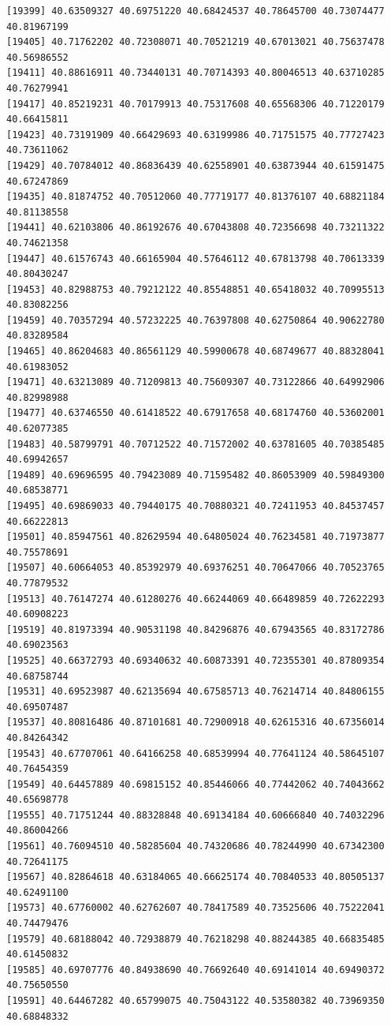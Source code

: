 \documentclass[
  letterpaper,
  DIV=11,
  numbers=noendperiod]{scrartcl}
\begin{document}
\begin{verbatim}
[19399] 40.63509327 40.69751220 40.68424537 40.78645700 40.73074477 40.81967199
[19405] 40.71762202 40.72308071 40.70521219 40.67013021 40.75637478 40.56986552
[19411] 40.88616911 40.73440131 40.70714393 40.80046513 40.63710285 40.76279941
[19417] 40.85219231 40.70179913 40.75317608 40.65568306 40.71220179 40.66415811
[19423] 40.73191909 40.66429693 40.63199986 40.71751575 40.77727423 40.73611062
[19429] 40.70784012 40.86836439 40.62558901 40.63873944 40.61591475 40.67247869
[19435] 40.81874752 40.70512060 40.77719177 40.81376107 40.68821184 40.81138558
[19441] 40.62103806 40.86192676 40.67043808 40.72356698 40.73211322 40.74621358
[19447] 40.61576743 40.66165904 40.57646112 40.67813798 40.70613339 40.80430247
[19453] 40.82988753 40.79212122 40.85548851 40.65418032 40.70995513 40.83082256
[19459] 40.70357294 40.57232225 40.76397808 40.62750864 40.90622780 40.83289584
[19465] 40.86204683 40.86561129 40.59900678 40.68749677 40.88328041 40.61983052
[19471] 40.63213089 40.71209813 40.75609307 40.73122866 40.64992906 40.82998988
[19477] 40.63746550 40.61418522 40.67917658 40.68174760 40.53602001 40.62077385
[19483] 40.58799791 40.70712522 40.71572002 40.63781605 40.70385485 40.69942657
[19489] 40.69696595 40.79423089 40.71595482 40.86053909 40.59849300 40.68538771
[19495] 40.69869033 40.79440175 40.70880321 40.72411953 40.84537457 40.66222813
[19501] 40.85947561 40.82629594 40.64805024 40.76234581 40.71973877 40.75578691
[19507] 40.60664053 40.85392979 40.69376251 40.70647066 40.70523765 40.77879532
[19513] 40.76147274 40.61280276 40.66244069 40.66489859 40.72622293 40.60908223
[19519] 40.81973394 40.90531198 40.84296876 40.67943565 40.83172786 40.69023563
[19525] 40.66372793 40.69340632 40.60873391 40.72355301 40.87809354 40.68758744
[19531] 40.69523987 40.62135694 40.67585713 40.76214714 40.84806155 40.69507487
[19537] 40.80816486 40.87101681 40.72900918 40.62615316 40.67356014 40.84264342
[19543] 40.67707061 40.64166258 40.68539994 40.77641124 40.58645107 40.76454359
[19549] 40.64457889 40.69815152 40.85446066 40.77442062 40.74043662 40.65698778
[19555] 40.71751244 40.88328848 40.69134184 40.60666840 40.74032296 40.86004266
[19561] 40.76094510 40.58285604 40.74320686 40.78244990 40.67342300 40.72641175
[19567] 40.82864618 40.63184065 40.66625174 40.70840533 40.80505137 40.62491100
[19573] 40.67760002 40.62762607 40.78417589 40.73525606 40.75222041 40.74479476
[19579] 40.68188042 40.72938879 40.76218298 40.88244385 40.66835485 40.61450832
[19585] 40.69707776 40.84938690 40.76692640 40.69141014 40.69490372 40.75650550
[19591] 40.64467282 40.65799075 40.75043122 40.53580382 40.73969350 40.68848332

\end{verbatim}
\end{document}

